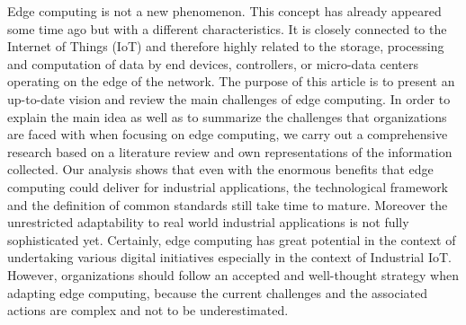 Edge computing is not a new phenomenon. This concept has already appeared some time ago but with a different characteristics. It is closely connected to the Internet of Things (IoT) and therefore highly related to the storage, processing and computation of data by end devices, controllers, or micro-data centers operating on the edge of the network. The purpose of this article is to present an up-to-date vision and review the main challenges of edge computing. In order to explain the main idea as well as to summarize the challenges that organizations are faced with when focusing on edge computing, we carry out a comprehensive research based on a literature review and own representations of the information collected. Our analysis shows that even with the enormous benefits that edge computing could deliver for industrial applications, the technological framework and the definition of common standards still take time to mature. Moreover the unrestricted adaptability to real world industrial applications is not fully sophisticated yet. Certainly, edge computing has great potential in the context of undertaking various digital initiatives especially in the context of Industrial IoT. However, organizations should follow an accepted and well-thought strategy when adapting edge computing, because the current challenges and the associated actions are complex and not to be underestimated.